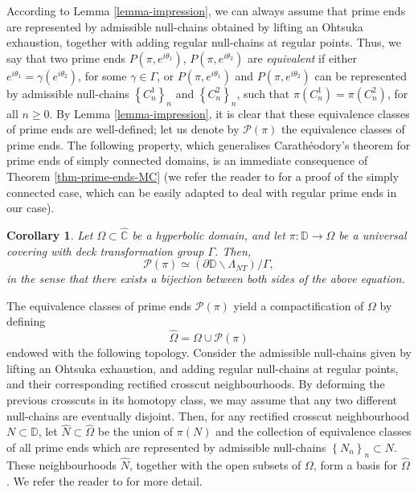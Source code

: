 \documentclass[11pt,a4paper,reqno]{amsart}
\theoremstyle{plain}
\newtheorem{cor}[thm]{Corollary}
\theoremstyle{definition}
\theoremstyle{plain}
\def\Chat{\widehat{\mathbb{C}}}
\def\DD{\mathbb{D}}
\renewcommand{\setminus}{\smallsetminus}
\begin{document}
According to Lemma \ref{lemma-impression}, we can always assume that prime ends are represented by admissible null-chains obtained by lifting an Ohtsuka exhaustion, together with adding regular null-chains at regular points. Thus,  we say that two prime ends $ P(\pi, e^{i\theta_1})$, $ P(\pi, e^{i\theta_2})$ are {\em equivalent} if either $ e^{i\theta_1} =\gamma(e^{i\theta_2})$, for some $ \gamma\in\Gamma $, or $ P(\pi, e^{i\theta_1})$ and $ P(\pi, e^{i\theta_2})$ can be represented by admissible null-chains $ \left\lbrace C^1_n\right\rbrace _n $ and $ \left\lbrace C^2_n\right\rbrace _n $, such that $ \pi  (C^1_n)=\pi  (C^2_n)$, for all $ n\geq 0 $. By Lemma \ref{lemma-impression}, it is clear that these equivalence classes of prime ends are well-defined; let us denote by $ \mathcal{P}(\pi) $ the equivalence classes of prime ends. The following property, which generalises Carathéodory's theorem for prime ends of simply connected domains, is an immediate consequence of Theorem \ref{thm-prime-ends-MC} (we refer the reader to \cite[Theorem 2.15]{Pom92} for a proof of the simply connected case, which can be easily adapted to deal with regular prime ends in our case).
\begin{cor}\label{cor:prime-end-bijection}
Let $\Omega\subset\Chat$ be a hyperbolic domain, and let $\pi\colon\DD\to\Omega$ be a universal covering with deck transformation group $\Gamma$. Then,
\[ \mathcal{P}(\pi) \simeq (\partial\DD\setminus\Lambda_{NT})/\Gamma, \]
in the sense that there exists a bijection between both sides of the above equation.
\end{cor}

The equivalence classes of prime ends $\mathcal{P}(\pi)$ yield a compactification of $ \Omega $ by defining
\[\widehat{\Omega}=\Omega \cup \mathcal{P}(\pi)  \]
endowed with the following topology. Consider the admissible null-chains given by lifting an Ohtsuka exhaustion, and adding regular null-chains at regular points, and their corresponding rectified crosscut neighbourhoods. By deforming the previous crosscuts in its homotopy class, we may assume that any two different null-chains are eventually disjoint. Then, for any rectified crosscut neighbourhood $ N\subset \mathbb{D} $, let $\widehat{N}\subset \widehat{\Omega}$ be the union of $ \pi(N) $ and the collection  of equivalence classes of all prime ends which are represented by admissible null-chains $ \left\lbrace N_n\right\rbrace _n\subset N $. These neighbourhoods $ \widehat{N} $, together with the open subsets of $ \Omega $, form a basis for $ \widehat{\Omega} $. We refer the reader to \cite[p. 388]{Epstein} for more detail.
\end{document}
